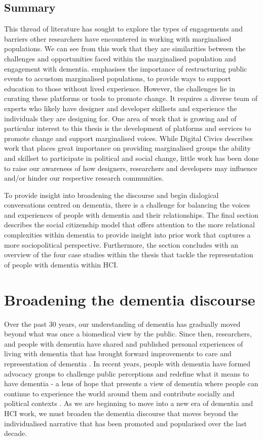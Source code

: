 \subsection{Summary}
\label{MP:summary}
This thread of literature has sought to explore the types of engagements and barriers other researchers have encountered in working with marginalised populations. We can see from this work that they are similarities between the challenges and opportunities faced within the marginalised population and engagement with dementia. \cite{hope_hackathons_2019} emphasises the importance of restructuring public events to accustom marginalised populations, to provide ways to support education to those without lived experience. However, the challenges lie in curating these platforms or tools to promote change. It requires a diverse team of experts who likely have designer and developer skillsets and experience the individuals they are designing for. One area of work that is growing and of particular interest to this thesis is the development of platforms and services to promote change and support marginalised voices. While Digital Civics describes work that places great importance on providing marginalised groups the ability and skillset to participate in political and social change, little work has been done to raise our awareness of how designers, researchers and developers may influence and/or hinder our respective research communities. 

To provide insight into broadening the discourse and begin dialogical conversations centred on dementia, there is a challenge for balancing the voices and experiences of people with dementia and their relationships. The final section describes the social citizenship model that offers attention to the more relational complexities within dementia to provide insight into prior work that captures a more sociopolitical perspective. Furthermore, the section concludes with an overview of the four case studies within the thesis that tackle the representation of people with dementia within HCI.

\section{Broadening the dementia discourse}
\label{BL:Discourse}
Over the past 30 years, our understanding of dementia has gradually moved beyond what was once a biomedical view by the public. Since then, researchers, and people with dementia have shared and published personal experiences of living with dementia that has brought forward improvements to care and representation of dementia \citep{smebye_influence_2013}. In recent years, people with dementia have formed advocacy groups to challenge public perceptions and redefine what it means to have dementia - a lens of hope that presents a view of dementia where people can continue to experience the world around them and contribute socially and political contexts \citep{bartlett2010broadening}. As we are beginning to move into a new era of dementia and HCI work, we must broaden the dementia discourse that moves beyond the individualised narrative that has been promoted and popularised over the last decade. 

